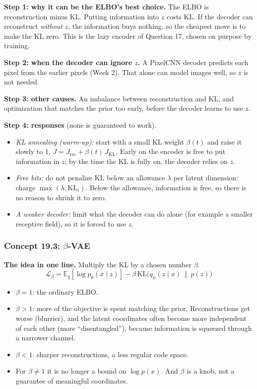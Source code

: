 \documentclass[12pt,a4paper]{article}
\begin{document}
\textbf{Step 1: why it can be the ELBO's best choice.} The ELBO is reconstruction minus KL. Putting information into $z$ costs KL. If the decoder can reconstruct \emph{without} $z$, the information buys nothing, so the cheapest move is to make the KL zero. This is the lazy encoder of Question 17, chosen on purpose by training.

\textbf{Step 2: when the decoder can ignore $z$.} A PixelCNN decoder predicts each pixel from the earlier pixels (Week 2). That alone can model images well, so $z$ is not needed.

\textbf{Step 3: other causes.} An imbalance between reconstruction and KL, and optimization that matches the prior too early, before the decoder learns to use $z$.

\textbf{Step 4: responses} (none is guaranteed to work).
\begin{itemize}[nosep]
  \item \emph{KL annealing (warm-up):} start with a small KL weight $\beta(t)$ and raise it slowly to 1, $J=J_{\text{rec}}+\beta(t)\,J_{\text{KL}}$. Early on the encoder is free to put information in $z$; by the time the KL is fully on, the decoder relies on $z$.
  \item \emph{Free bits:} do not penalize KL below an allowance $\lambda$ per latent dimension: charge $\max(\lambda,\mathrm{KL}_i)$. Below the allowance, information is free, so there is no reason to shrink it to zero.
  \item \emph{A weaker decoder:} limit what the decoder can do alone (for example a smaller receptive field), so it is forced to use $z$.
\end{itemize}

\subsubsection{Concept 19.3: $\beta$-VAE}\label{c19-3}

\textbf{The idea in one line.} Multiply the KL by a chosen number $\beta$.
\[
\mathcal{L}_\beta=\mathbb{E}_q[\log p_\theta(x\mid z)]-\beta\,\mathrm{KL}\big(q_\phi(z\mid x)\,\|\,p(z)\big)
\]
\begin{itemize}[nosep]
  \item $\beta=1$: the ordinary ELBO.
  \item $\beta>1$: more of the objective is spent matching the prior. Reconstructions get worse (blurrier), and the latent coordinates often become more independent of each other (more ``disentangled''), because information is squeezed through a narrower channel.
  \item $\beta<1$: sharper reconstructions, a less regular code space.
  \item For $\beta\ne1$ it is no longer a bound on $\log p(x)$. And $\beta$ is a knob, not a guarantee of meaningful coordinates.
\end{itemize}
\end{document}
